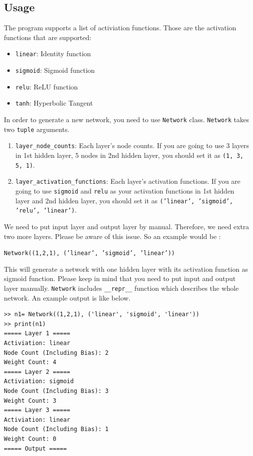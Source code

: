 \documentclass{homework}
\newenvironment{code}{\captionsetup{type=listing}}{}
\begin{document}
\subsection{Usage}
The program supports a list of activiation functions. Those are the activation functions that are supported:
\begin{itemize}
    \item \texttt{linear}: Identity function
    \item \texttt{sigmoid}: Sigmoid function
    \item \texttt{relu}: ReLU function
    \item \texttt{tanh}: Hyperbolic Tangent
\end{itemize}

In order to generate a new network, you need to use \texttt{Network} class. \texttt{Network} takes two \texttt{tuple} arguments.
\begin{enumerate}
    \item \texttt{layer_node_counts}: Each layer's node counts. If you are going to use 3 layers in 1st hidden layer, 5 nodes in 2nd hidden layer, you should set it as \texttt{(1, 3, 5, 1)}.
    \item \texttt{layer_activation_functions}: Each layer's activation functions. If you are going to use \texttt{sigmoid} and \texttt{relu} as your activation functions in 1st hidden layer and 2nd hidden layer, you should set it as \texttt{('linear', 'sigmoid', 'relu', 'linear')}.
\end{enumerate}
We need to put input layer and output layer by manual. Therefore, we need extra two more layers. Please be aware of this issue. So an example would be :
\\
\begin{center}
    \texttt{Network((1,2,1), ('linear', 'sigmoid', 'linear'))}    
\end{center}
This will generate a network with one hidden layer with its activation function as sigmoid function. Please keep in mind that you need to put input and output layer manually. \texttt{Network} includes \texttt{__repr__} function which describes the whole network. An example output is like below.
\\
\begin{center}
\begin{code}
\begin{verbatim}
>> n1= Network((1,2,1), ('linear', 'sigmoid', 'linear'))
>> print(n1)
===== Layer 1 =====
Activiation: linear
Node Count (Including Bias): 2
Weight Count: 4
===== Layer 2 =====
Activiation: sigmoid
Node Count (Including Bias): 3
Weight Count: 3
===== Layer 3 =====
Activiation: linear
Node Count (Including Bias): 1
Weight Count: 0
===== Output =====
\end{verbatim}
\end{code}
\end{center}
\end{document}
